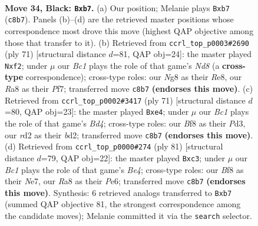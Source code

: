 \documentclass[11pt]{article}
\begin{document}
\clearpage

\begin{figure}[p]\centering
\begin{subfigure}{0.46\textwidth}\centering
\resizebox{\linewidth}{!}{%
\newchessgame
\chessboard[
  setfen={r1b2bn1/pNp1k3/R1p1p3/8/5P2/8/3R4/1NB1K3 b - - 0 34},
  showmover=false,
  pgfstyle=straightmove, color=movearrow, markmove={c8-b7}
]}
\caption{}
\end{subfigure}\hfill
\begin{subfigure}{0.46\textwidth}\centering
\resizebox{\linewidth}{!}{%
\newchessgame
\chessboard[
  setfen={4r1k1/5pp1/3R4/3p3N/8/2b2P2/5BPP/3n1K2 b - - 1 36},
  showmover=false,
  pgfstyle=straightmove, color=movearrow, markmove={d1-f2}
]}
\caption{}
\end{subfigure}
\\[4pt]
\begin{subfigure}{0.46\textwidth}\centering
\resizebox{\linewidth}{!}{%
\newchessgame
\chessboard[
  setfen={5rk1/8/5pp1/1p1b4/3pNR2/1P1p4/3B3K/8 b - - 1 36},
  showmover=false,
  pgfstyle=straightmove, color=movearrow, markmove={d5-e4}
]}
\caption{}
\end{subfigure}\hfill
\begin{subfigure}{0.46\textwidth}\centering
\resizebox{\linewidth}{!}{%
\newchessgame
\chessboard[
  setfen={8/4n1k1/4p1p1/1b1pb3/6PP/p1R5/B5K1/1R6 b - - 1 41},
  showmover=false,
  pgfstyle=straightmove, color=movearrow, markmove={e5-c3}
]}
\caption{}
\end{subfigure}
\caption{\textbf{Move 34, Black: \texttt{Bxb7}.} (a) Our position; Melanie plays \texttt{Bxb7} (\texttt{c8b7}). Panels (b)--(d) are the retrieved master positions whose correspondence most drove this move (highest QAP objective among those that transfer to it). (b) Retrieved from \texttt{ccrl\_top\_p0003\#2690} (ply 71) [structural distance $d$=81, QAP obj=24]: the master played \texttt{Nxf2}; under $\mu$ our \emph{Bc1} plays the role of that game's \emph{Nd8} (a \textbf{cross-type} correspondence); cross-type roles: our \emph{N}g8 as their \emph{R}e8, our \emph{R}a8 as their \emph{P}f7; transferred move \texttt{c8b7} \textbf{(endorses this move)}. (c) Retrieved from \texttt{ccrl\_top\_p0002\#3417} (ply 71) [structural distance $d$=80, QAP obj=23]: the master played \texttt{Bxe4}; under $\mu$ our \emph{Bc1} plays the role of that game's \emph{Bd4}; cross-type roles: our \emph{B}f8 as their \emph{P}d3, our \emph{r}d2 as their \emph{b}d2; transferred move \texttt{c8b7} \textbf{(endorses this move)}. (d) Retrieved from \texttt{ccrl\_top\_p0000\#274} (ply 81) [structural distance $d$=79, QAP obj=22]: the master played \texttt{Bxc3}; under $\mu$ our \emph{Bc1} plays the role of that game's \emph{Be4}; cross-type roles: our \emph{B}f8 as their \emph{N}e7, our \emph{R}a8 as their \emph{P}e6; transferred move \texttt{c8b7} \textbf{(endorses this move)}. Synthesis: 6 retrieved analogs transferred to \texttt{Bxb7} (summed QAP objective 81, the strongest correspondence among the candidate moves); Melanie committed it via the \texttt{search} selector.}
\label{fig:thought-m67}
\end{figure}
\end{document}
